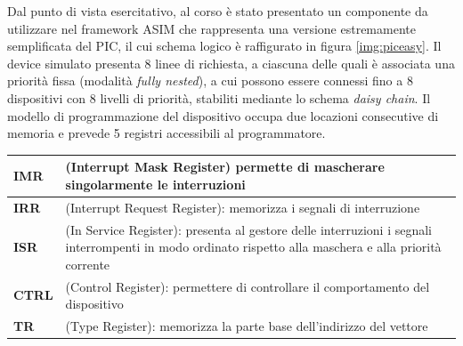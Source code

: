 Dal punto di vista esercitativo, al corso è stato presentato un componente da utilizzare nel framework ASIM che rappresenta una versione estremamente semplificata del PIC, il cui schema logico è raffigurato in figura \ref{img:piceasy}.
Il device simulato presenta 8 linee di richiesta, a ciascuna delle quali è associata una priorità fissa (modalità \textit{fully nested}), a cui possono essere connessi fino a 8 dispositivi con 8 livelli di priorità, stabiliti mediante lo schema \textit{daisy chain}. 
Il modello di programmazione del dispositivo occupa due locazioni consecutive di memoria e prevede 5 registri accessibili al programmatore. \\


\begin{tabular}{|p{3cm}|p{10cm}|}
    \hline
    \centering \textbf{IMR} &  (Interrupt Mask Register) permette di mascherare singolarmente le interruzioni \\
    \hline
    \centering \textbf{IRR} &  (Interrupt Request Register): memorizza i segnali di interruzione \\
    \hline
    \centering \textbf{ISR} &  (In Service Register): presenta al gestore delle interruzioni i segnali interrompenti in modo ordinato rispetto alla maschera e alla priorità corrente \\
    \hline
    \centering \textbf{CTRL} &  (Control Register): permettere di controllare il comportamento del dispositivo\\
    \hline
    \centering \textbf{TR} &  (Type Register): memorizza la parte base dell’indirizzo del vettore \\
    \hline
\end{tabular}




